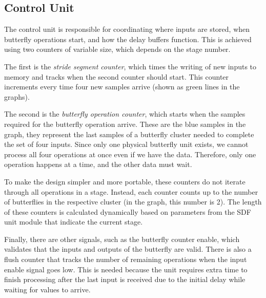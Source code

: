 \subsection{Control Unit}
The control unit is responsible for coordinating where inputs are stored, when butterfly operations start, and how the delay buffers function. This is achieved using two counters of variable size, which depends on the stage number.

The first is the \textit{stride segment counter}, which times the writing of new inputs to memory and tracks when the second counter should start. This counter increments every time four new samples arrive (shown as green lines in the graphs).

The second is the \textit{butterfly operation counter}, which starts when the samples required for the butterfly operation arrive. These are the blue samples in the graph, they represent the last samples of a butterfly cluster needed to complete the set of four inputs. Since only one physical butterfly unit exists, we cannot process all four operations at once even if we have the data. Therefore, only one operation happens at a time, and the other data must wait.

To make the design simpler and more portable, these counters do not iterate through all operations in a stage. Instead, each counter counts up to the number of butterflies in the respective cluster (in the graph, this number is 2). The length of these counters is calculated dynamically based on parameters from the SDF unit module that indicate the current stage.

Finally, there are other signals, such as the butterfly counter enable, which validates that the inputs and outputs of the butterfly are valid. There is also a flush counter that tracks the number of remaining operations when the input enable signal goes low. This is needed because the unit requires extra time to finish processing after the last input is received due to the initial delay while waiting for values to arrive.

